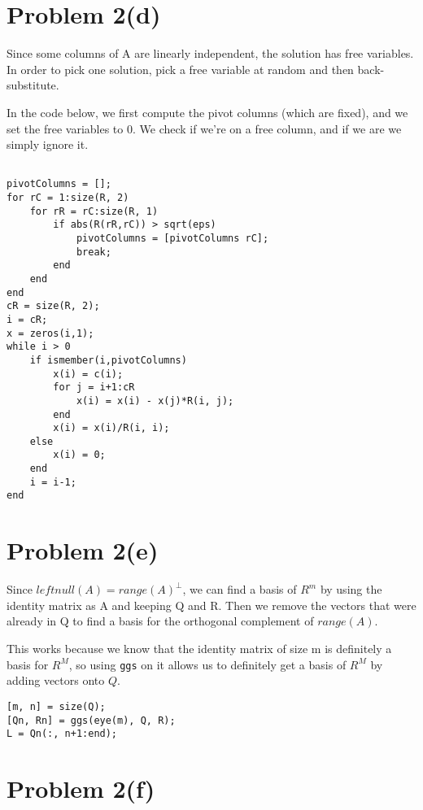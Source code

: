 \documentclass{article}
\begin{document}
\section*{Problem 2(d)}

Since some columns of A are linearly independent, the solution has free variables. In order to pick one solution, pick a free variable at random and then back-substitute.

In the code below, we first compute the pivot columns (which are fixed), and we set the free variables to 0. We check if we're on a free column, and if we are we simply ignore it.

\begin{verbatim}

pivotColumns = [];
for rC = 1:size(R, 2)
    for rR = rC:size(R, 1)
        if abs(R(rR,rC)) > sqrt(eps)
            pivotColumns = [pivotColumns rC];
            break;
        end
    end
end
cR = size(R, 2);
i = cR;
x = zeros(i,1);
while i > 0
    if ismember(i,pivotColumns)
        x(i) = c(i);
        for j = i+1:cR
            x(i) = x(i) - x(j)*R(i, j);
        end
        x(i) = x(i)/R(i, i);
    else
        x(i) = 0;
    end
    i = i-1;
end

\end{verbatim}

\section*{Problem 2(e)}

Since $leftnull(A) = range(A)^{\perp}$, we can find a basis of $R^m$ by using the identity matrix as A and keeping Q and R. Then we remove the vectors that were already in Q to find a basis for the orthogonal complement of $range(A)$.

This works because we know that the identity matrix of size m is definitely a basis for $R^M$, so using \verb#ggs# on it allows us to definitely get a basis of $R^M$ by adding vectors onto $Q$.

\begin{verbatim}
[m, n] = size(Q);
[Qn, Rn] = ggs(eye(m), Q, R);
L = Qn(:, n+1:end);
\end{verbatim}

\section*{Problem 2(f)}

\end{document}

